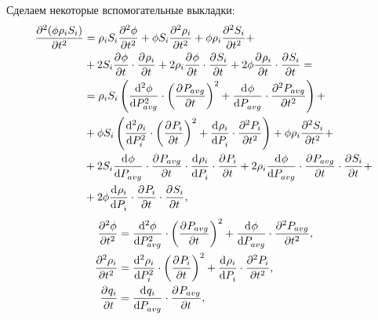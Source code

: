 Сделаем некоторые вспомогательные выкладки:
\begin{equation} \label{eq:calcs1}
 \begin{aligned}
  \pd[2]{(\phi \rho_i S_i)}{t} &= \rho_i S_i \pd[2]{\phi}{t} + \phi S_i \pd[2]{\rho_i}{t} + \phi \rho_i \pd[2]{S_i}{t} + \\
  &+ 2S_i \pd{\phi}{t} \cdot \pd{\rho_i}{t} + 2\rho_i \pd{\phi}{t} \cdot \pd{S_i}{t} + 2\phi \pd{\rho_i}{t} \cdot \pd{S_i}{t} = \\
  &= \rho_i S_i \left(  \dd[2]{\phi}{P_{avg}} \cdot {\left( \pd{P_{avg}}{t}\right) }^2 + \dd{\phi}{P_{avg}} \cdot \pd[2]{P_{avg}}{t} \right) +\\
  &+ \phi S_i \left( \dd[2]{\rho_i}{P_i} \cdot {\left( \pd{P_i}{t}\right) }^2 + \dd{\rho_i}{P_i} \cdot \pd[2]{P_i}{t} \right) + \phi \rho_i \pd[2]{S_i}{t} +\\
  &+ 2S_i \dd{\phi}{P_{avg}} \cdot \pd{P_{avg}}{t} \cdot \dd{\rho_i}{P_i} \cdot \pd{P_i}{t} + 2\rho_i \dd{\phi}{P_{avg}} \cdot \pd{P_{avg}}{t} \cdot \pd{S_i}{t} +\\
  &+ 2\phi \dd{\rho_i}{P_i} \cdot \pd{P_i}{t} \cdot \pd{S_i}{t},
 \end{aligned}
\end{equation}
\begin{equation} \label{eq:calcs2}
 \begin{aligned}
  \pd[2]{\phi}{t} &= \dd[2]{\phi}{P_{avg}} \cdot {\left( \pd{P_{avg}}{t}\right) }^2 + \dd{\phi}{P_{avg}} \cdot \pd[2]{P_{avg}}{t}, \\
  \pd[2]{\rho_i}{t} &= \dd[2]{\rho_i}{P_i} \cdot {\left( \pd{P_i}{t}\right) }^2 + \dd{\rho_i}{P_i} \cdot \pd[2]{P_i}{t}, \\
  \pd{q_i}{t} &= \dd{q_i}{P_{avg}} \cdot \pd{P_{avg}}{t},
 \end{aligned}
\end{equation}

